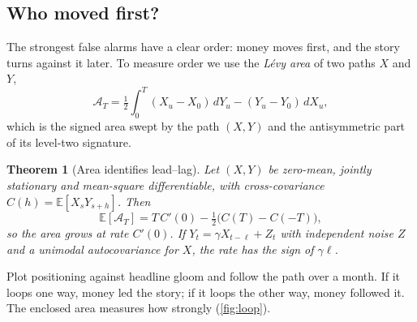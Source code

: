 \documentclass[11pt,a4paper]{article}
\theoremstyle{sci}
\newtheorem{theorem}{Theorem}[section]
\theoremstyle{scidef}
\newcommand{\E}{\mathbb{E}}
\begin{document}
\subsection{Who moved first?}\label{sec:leadlag}

The strongest false alarms have a clear order: money moves first, and the story turns against it later. To measure order we use the \emph{L\'evy area} of two paths $X$ and $Y$,
\[
  \mathcal{A}_T=\tfrac12\int_0^T(X_u-X_0)\,dY_u-(Y_u-Y_0)\,dX_u,
\]
which is the signed area swept by the path $(X,Y)$ and the antisymmetric part of its level-two signature.

\begin{theorem}[Area identifies lead--lag]\label{thm:levy}
Let $(X,Y)$ be zero-mean, jointly stationary and mean-square differentiable, with cross-covariance $C(h)=\E[X_sY_{s+h}]$. Then
\[
  \E[\mathcal{A}_T]=T\,C'(0)-\tfrac12\big(C(T)-C(-T)\big),
\]
so the area grows at rate $C'(0)$. If $Y_t=\gamma X_{t-\ell}+Z_t$ with independent noise $Z$ and a unimodal autocovariance for $X$, the rate has the sign of $\gamma\ell$.
\end{theorem}

\begin{inwords}
Plot positioning against headline gloom and follow the path over a month. If it loops one way, money led the story; if it loops the other way, money followed it. The enclosed area measures how strongly (\cref{fig:loop}).
\end{inwords}
\end{document}
